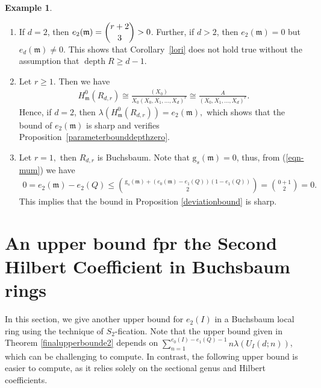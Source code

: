 \documentclass[reqno,a4paper,dvipsnames]{amsart}
\newcommand{\m}{\mathfrak{m} }
\newcommand{\n}{\mathfrak{n} }
\newcommand{\depth}{\operatorname{depth}}
\theoremstyle{definition}
\newtheorem{example}[theorem]{Example}
\begin{document}
\begin{example}
\begin{enumerate}
Consider
 \begin{align*}
    \lambda \left( \frac{R_{d,r}}{\m^n}\right)
    &=  \lambda \left( \frac{A}{\n^n + K_r}\right) & \\
    &= \lambda \left(\frac{A}{(X_1, \ldots, X_d)^n + (X_0) } \right)
  +  \lambda \left( \frac{A}{(X_0, \ldots, X_d)^r} \right) & \text{ (from (\ref{seqabc}))}\\
  &= \dbinom{n+d-1}{d} + \dbinom{r+d}{d+1} & \text{(for sufficiently large n).}
 \end{align*}
 Hence 
\begin{eqnarray*}
e_i(\m) =e_i(Q)= \begin{cases}
   1 & ;i=0\\
   0 & ;i=1, \ldots, d-1\\
   (-1)^d\dbinom{r + d}{d+1} & ;i=d.  
\end{cases}
\end{eqnarray*}
\item 
If $d=2$, then $e_2(\m)=\dbinom{r+2}{3}>0$. Further, if $d>2$, then $e_2(\m)=0$ but $e_d(\m) \not =0$. This shows that  Corollary~\ref{lori} does not hold true without the assumption  that $\depth R \geq d-1$. 

\item Let $r \geq 1$. Then we have 
\begin{eqnarray*}
    H^0_{\m}(R_{d,r}) 
    \cong \frac{(X_0)}{X_0(X_0, X_1, \ldots, X_d)^r} 
    \cong  \frac{ A}{(X_0, X_1, \ldots, X_d)^r}. 
\end{eqnarray*}
Hence,  if $d=2$, then  $\lambda(H^0_{\m}(R_{d,r}) ) = e_2(\m),$ which shows that the bound of $e_2(\m)$ is sharp and  verifies  
Proposition~\ref{parameterbounddepthzero}.  


\item Let $r=1,$ then $R_{d,r}$ is Buchsbaum. Note that $\mathrm{g}_s(\m) = 0$, thus, from (\ref{eqn-mum}) we have 
\begin{eqnarray*}
    0 = e_2(\m)-e_2(Q) \leq \binom{\mathrm{g}_s(\m) + (e_0(\m) - e_1(Q)) (1 -e_1 (Q))}{2}
    = \binom{0  + 1}{2} =0.
 \end{eqnarray*}
 This implies that the bound in Proposition \ref{deviationbound} is sharp. 
    \end{enumerate}
 \end{example}

\section{An upper bound fpr the Second Hilbert Coefficient in Buchsbaum rings} \label{section5}
In this section, we give another upper bound for $e_{2}(I)$ in a Buchsbaum local ring using the technique of $S_{2}$-fication.  Note that the upper bound given in Theorem \ref{finalupperbounde2}  depends on $\displaystyle \sum_{n=1}^{e_{0}(I)-e_{1}(Q)-1}
           n\lambda(U_{I}(d;n))$, which can be challenging to compute. In contrast, the following upper bound is easier to compute, as it relies solely on the sectional genus and Hilbert coefficients.
           
\end{document}
